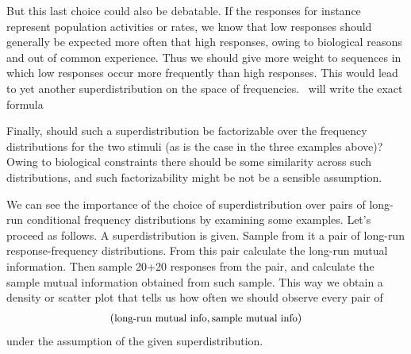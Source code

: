 \documentclass[\ifafour a4paper,12pt,\else a5paper,10pt,\fi%
onecolumn,oneside,article,%
british%
]{memoir}
\theoremstyle{remark}
\theoremstyle{innote}
\renewcommand*{\|}[1][]{\nonscript\,#1\vert\nonscript\;\mathopen{}}
\renewcommand*{\=}{\TextOrMath\texteq\eq}
\newcommand*{\puzzle}{{\fontencoding{U}\fontfamily{fontawesometwo}\selectfont\symbol{225}}}
\newcommand{\mynote}[1]{ {\color{notecolour}\puzzle\ #1}}
\begin{document}
But this last choice could also be debatable. If the responses for instance
represent population activities or rates, we know that low responses should
generally be expected more often that high responses, owing to biological
reasons and out of common experience. Thus we should give more weight to
sequences in which low responses occur more frequently than high responses.
This would lead to yet another superdistribution on the space of
frequencies. \mynote{will write the exact formula}

Finally, should such a superdistribution be factorizable over the frequency
distributions for the two stimuli (as is the case in the three examples
above)? Owing to biological constraints there should be some similarity
across such distributions, and such factorizability might be not be a
sensible assumption.

\medskip

We can see the importance of the choice of superdistribution over pairs of
long-run conditional frequency distributions by examining some examples.
Let's proceed as follows. A superdistribution is given. Sample from it a
pair of long-run response-frequency distributions. From this pair calculate
the long-run mutual information. Then sample 20+20 responses from the pair,
and calculate the sample mutual information obtained from such sample. This
way we obtain a density or scatter plot that tells us how often we should
observe every pair of
\[(\text{\small long-run mutual info}, \text{\small sample mutual info})\]
under the assumption of the given superdistribution.
\end{document}
